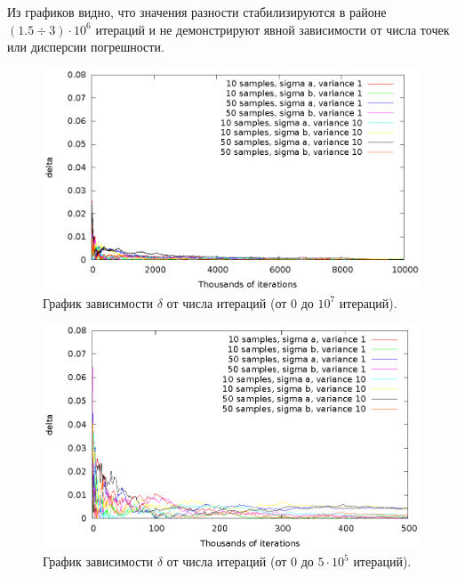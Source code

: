 \documentclass[12pt,a4paper]{article}
\theoremstyle{definition}
\begin{document}
Из графиков видно, что значения разности стабилизируются в районе $(1.5 \div 3) \cdot 10^6$
итераций и не демонстрируют явной зависимости от числа точек или дисперсии погрешности.

\begin{figure}[h]
  \centering
  \includegraphics[scale=1.2]{figs/classic/variance_all_0_all.eps}
  \caption{График зависимости $\delta$ от числа итераций (от 0 до $10^7$ итераций).}
  \label{fig:classic_all_0_all}
\end{figure}

\begin{figure}[h]
  \centering
  \includegraphics[scale=1.2]{figs/classic/variance_all_0_500.eps}
  \caption{График зависимости $\delta$ от числа итераций (от 0 до $5 \cdot 10^5$ итераций).}
  \label{fig:classic_all_0_500}
\end{figure}
\end{document}
